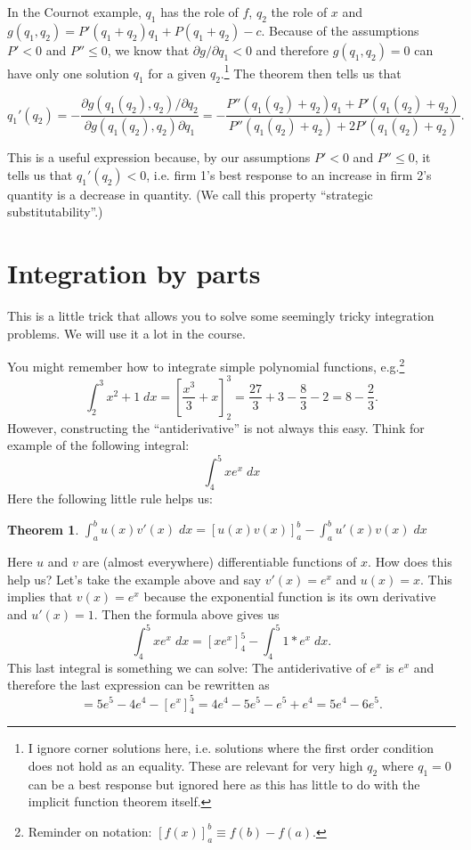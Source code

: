 \documentclass[a4paper,12pt]{article}
\newtheorem{theorem}{Theorem}
\begin{document}
In the Cournot example, $q_1$ has the role of $f$, $q_2$ the role of $x$ and $g(q_1,q_2)= P'(q_1+q_2)q_1+P(q_1+q_2)-c$. Because of the assumptions $P'<0$ and $P''\leq 0$, we know that $\partial g/\partial q_1<0$ and therefore $g(q_1,q_2)=0$ can have only one solution $q_1$ for a given $q_2$.\footnote{I ignore corner solutions here, i.e. solutions where the first order condition does not hold as an equality. These are relevant for very high $q_2$ where $q_1=0$ can be a best response but ignored here as this has little to do with the implicit function theorem itself.} The theorem then tells us that

\begin{equation*}
   q_1'(q_2)=-\frac{\partial g(q_1(q_2),q_2)/\partial q_2}{\partial g(q_1(q_2),q_2)\partial q_1}=-\frac{P''(q_1(q_2)+q_2)q_1+P'(q_1(q_2)+q_2)}{P''(q_1(q_2)+q_2)+2P'(q_1(q_2)+q_2)}.
\end{equation*}

This is a useful expression because, by our assumptions $P'<0$ and $P''\leq0$, it tells us that $q_1'(q_2)<0$, i.e. firm 1's best response to an increase in firm 2's quantity is a decrease in quantity. (We call this property ``strategic substitutability''.)

\section{Integration by parts}
\label{sec:integration-parts}

This is a little trick that allows you to solve some seemingly tricky integration problems. We will use it a lot in the course. 

You might remember how to integrate simple polynomial functions, e.g.\footnote{Reminder on notation: $[f(x)]_a^b\equiv f(b)-f(a)$.}
$$\int_{2}^{3}x^{2}+1\;dx=\left[ \frac{x^{3}}{3}+x\right]_{2}^{3}=\frac{27}{3}+3-\frac{8}{3}-2=8-\frac{2}{3}.$$
However, constructing the ``antiderivative'' is not always this easy. Think for example of the following integral:
$$\int_{4}^{5} x e^{x}\;dx$$
Here the following little rule helps us:
\begin{theorem}
$\int_{a}^{b}u(x)v'(x)\;dx=\left[u(x)v(x)\right]_{a}^{b}-\int_{a}^{b}u'(x)v(x)\;dx$
\end{theorem} 

Here $u$ and $v$ are (almost everywhere) differentiable functions of $x$. How does this help us? Let's take the example above and say $v'(x)=e^x$ and $u(x)=x$. This implies that $v(x)=e^x$ because the exponential function is its own derivative and $u'(x)=1$. Then the formula above gives us
\begin{equation*}
  \int_4^5 x e^x\;dx=\left[x e^x\right]_4^5-\int_4^5 1*e^x\;dx.
\end{equation*}
This last integral is something we can solve: The antiderivative of $e^x$ is $e^x$ and therefore the last expression can be rewritten as
\begin{equation*}
  = 5 e^5-4 e^4-\left[e^x\right]_4^5=4 e^4-5 e^5-e^5+e^4=5 e^4-6 e^5.
\end{equation*}
\end{document}
